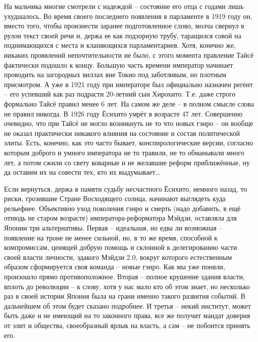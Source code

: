 На мальчика многие смотрели с надеждой – состояние его отца с годами лишь ухудшалось. Во время своего последнего появления в парламенте в 1919 году он, вместо того, чтобы произнести заранее подготовленное слово, молча свернул в рулон текст своей речи и, держа ее как подзорную трубу, таращился совой на поднимающихся с места и кланяющихся парламентариев. Хотя, конечно же, никаких проявлений непочтительности не было, с этого момента правление Тайсё фактически подошло к концу. Большую часть времени император начинает проводить на загородных виллах вне Токио под заботливым, но плотным присмотром. А уже в 1921 году при императоре был официально назначен регент – его успевший как раз подрасти 20-летний сын Хирохито. Т.е. даже строго формально Тайсё правил менее 6 лет. На самом же деле – в полном смысле слова не правил никогда. В 1926 году Ёсихито умрёт в возрасте 47 лет. Совершенно очевидно, что при Тайсё не могло возникнуть не то что новых гэнро – он вообще не оказал практически никакого влияния на состояние и состав политической элиты. Есть, конечно, как это часто бывает, конспирологические версии, согласно которым доброго и умного императора не то травили, не то обманывали много лет, а потом сжили со свету коварные и не желавшие реформ приближённые, ну да оставим их на совести тех, кто их выдумывает…

Если вернуться, держа в памяти судьбу несчастного Ёсихито, немного назад, то риски, грозившие Стране Восходящего солнца, начинают выглядеть куда рельефнее. Объективно уход поколения гэнро и смерть (надо добавить, в ещё отнюдь не старом возрасте) императора-реформатора Мэйдзи, оставляла для Японии три альтернативы. Первая – идеальная, но едва ли возможная – появление на троне не менее сильной, но, в то же время, способной к компромиссам, ценящей добрую помощь и склонной к делегированию части своей власти личности, эдакого Мэйдзи 2.0, вокруг которого естественным образом сформируется своя команда – новые гэнро. Как мы уже поняли, произошло прямо противоположное. Вторая – полное крушение здания власти, вплоть до революции – к слову, хотя у нас мало кто об этом знает, но несколько раз в своей истории Япония была на грани именно такого развития событий. В дальнейшем об этом будет сказано подробнее. И третья – некий институт, может быть даже и не имеющий на то законного права, все же получит мандат доверия от элит и общества, своеобразный ярлык на власть, а сам – не побоится принять его.


